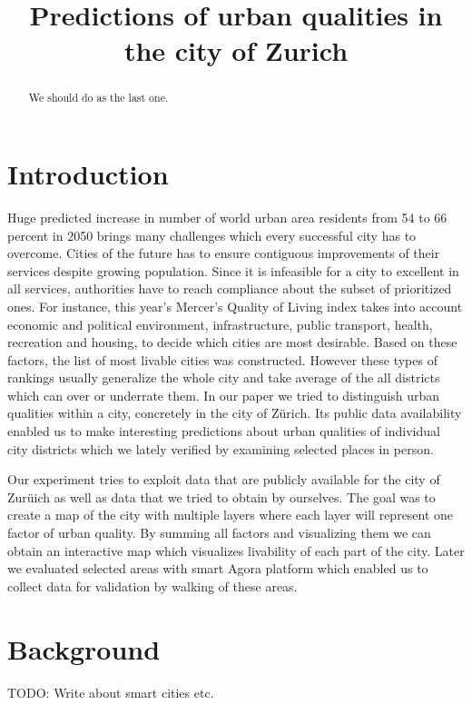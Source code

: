 \documentclass[letterpaper]{article}
\title{Predictions of urban qualities in the city of Zurich}
\begin{document}
%
\maketitle
%

\begin{abstract}
We should do as the last one.
\end{abstract}

\section{Introduction}\label{sec:intro}
Huge predicted increase in number of world urban area residents from 54 to 66 percent in 2050 brings many challenges 
which every successful city has to overcome. Cities of the future has to ensure contiguous improvements of their 
services despite growing population. Since it is infeasible for a city to excellent in all services, 
authorities have to reach compliance about the subset of prioritized ones. For instance, this year's Mercer's Quality of Living index 
takes into account economic and political environment, infrastructure, public transport, health, recreation and housing, 
to decide which cities are most desirable. Based on these factors, the list of most livable cities was constructed. 
However these types of rankings usually generalize the whole city and take average of the all districts which can 
over or underrate them. In our paper we tried to distinguish urban qualities within a city, concretely in the city of Zürich. 
Its public data availability enabled us to make interesting predictions about urban qualities of individual city districts 
which we lately verified by examining selected places in person. 

\indent Our experiment tries to exploit data that are publicly available for the city of Zurüich as well as data that we tried to obtain by ourselves. 
The goal was to create a map of the city with multiple layers where each layer will represent one factor of urban quality. By summing all factors and 
visualizing them we can obtain an interactive map which visualizes livability of each part of the city. Later we evaluated selected areas with smart
Agora platform which enabled us to collect data for validation by walking of these areas.

\section{Background}\label{sec:background}
TODO: Write about smart cities etc.
\end{document}
